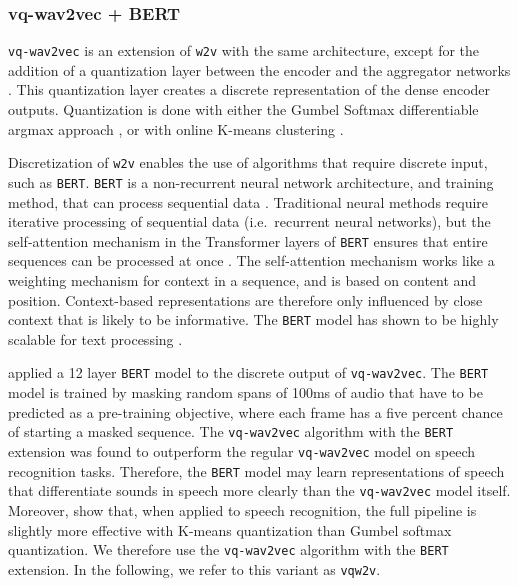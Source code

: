 \documentclass[11pt,a4paper]{article}
\begin{document}
\subsubsection{vq-wav2vec + BERT}
\texttt{vq-wav2vec} is an extension of \texttt{w2v} with the same architecture, except for the addition of a quantization layer between the encoder and the aggregator networks \citep{baevski2019vq}.
This quantization layer creates a discrete representation of the dense encoder outputs.
Quantization is done with either the Gumbel Softmax differentiable argmax approach \citep{jang_categorical_2017}, or with online K-means clustering \citep{van_den_oord_neural_2017}.

Discretization of \texttt{w2v} enables the use of algorithms that require discrete input, such as \texttt{BERT}.
\texttt{BERT} is a non-recurrent neural network architecture, and training method, that can process sequential data \citep{devlin_bert_2019}. 
Traditional neural methods require iterative processing of sequential data (i.e.~recurrent neural networks), but the self-attention mechanism in the Transformer layers of \texttt{BERT} ensures that entire sequences can be processed at once \citep{vaswaniAttentionAllYou2017}. 
The self-attention mechanism works like a weighting mechanism for context in a sequence, and is based on content and position. 
Context-based representations are therefore only influenced by close context that is likely to be informative.
The \texttt{BERT} model has shown to be highly scalable for text processing \citep{devlin_bert_2019}.

\citet{baevski2019vq} applied a 12 layer \texttt{BERT} model to the discrete output of \texttt{vq-wav2vec}.
The \texttt{BERT} model is trained by masking random spans of 100ms of audio that have to be predicted as a pre-training objective, where each frame has a five percent chance of starting a masked sequence.
The \texttt{vq-wav2vec} algorithm with the \texttt{BERT} extension was found to outperform the regular \texttt{vq-wav2vec} model on speech recognition tasks.
Therefore, the \texttt{BERT} model may learn representations of speech that differentiate sounds in speech more clearly than the \texttt{vq-wav2vec} model itself. 
Moreover, \citet{baevski2019vq} show that, when applied to speech recognition, the full pipeline is slightly more effective with K-means quantization than Gumbel softmax quantization. We therefore use the \texttt{vq-wav2vec} algorithm with the \texttt{BERT} extension. In the following, we refer to this variant as \texttt{vqw2v}.
\end{document}
